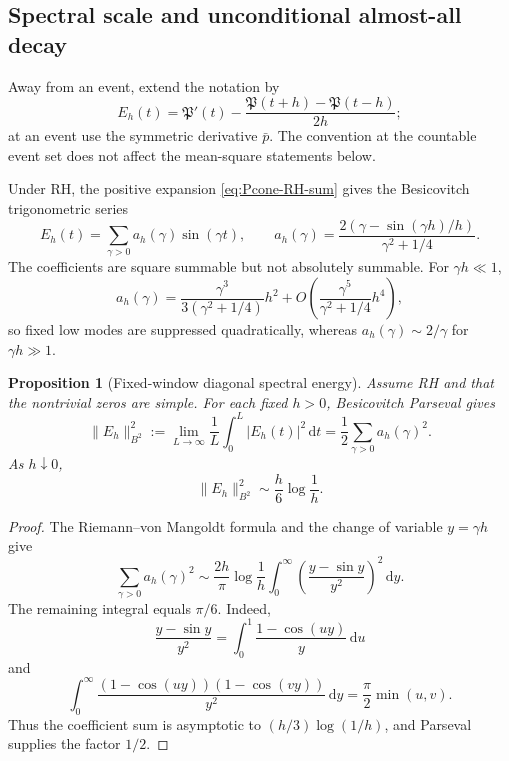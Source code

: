 \documentclass[11pt,a4paper]{article}
\numberwithin{equation}{section}
\newtheorem{proposition}[theorem]{Proposition}
\theoremstyle{definition}
\newcommand{\dd}{\,\mathrm{d}}
\begin{document}
\subsection{Spectral scale and unconditional almost-all decay}

Away from an event, extend the notation by
\[
 E_h(t)=\mathfrak P'(t)
 -\frac{\mathfrak P(t+h)-\mathfrak P(t-h)}{2h};
\]
at an event use the symmetric derivative \(\bar p\).  The convention at the
countable event set does not affect the mean-square statements below.

Under RH, the positive expansion \eqref{eq:Pcone-RH-sum} gives the
Besicovitch trigonometric series
\begin{equation}\label{eq:Eh-spectral-filter}
 E_h(t)=\sum_{\gamma>0}a_h(\gamma)\sin(\gamma t),
 \qquad
 a_h(\gamma)=
 \frac{2\left(\gamma-\sin(\gamma h)/h\right)}{\gamma^2+1/4}.
\end{equation}
The coefficients are square summable but not absolutely summable.  For
\(\gamma h\ll1\),
\[
 a_h(\gamma)
 =\frac{\gamma^3}{3(\gamma^2+1/4)}h^2
 +O\!\left(\frac{\gamma^5}{\gamma^2+1/4}h^4\right),
\]
so fixed low modes are suppressed quadratically, whereas
\(a_h(\gamma)\sim2/\gamma\) for \(\gamma h\gg1\).

\begin{proposition}[Fixed-window diagonal spectral energy]
\label{prop:Eh-spectral-energy}
Assume RH and that the nontrivial zeros are simple.  For each fixed \(h>0\),
Besicovitch Parseval gives
\[
 \|E_h\|_{B^2}^2
 :=\lim_{L\to\infty}\frac1L\int_0^L|E_h(t)|^2\dd t
 =\frac12\sum_{\gamma>0}a_h(\gamma)^2.
\]
As \(h\downarrow0\),
\begin{equation}\label{eq:Eh-spectral-energy-asymptotic}
 \boxed{
 \|E_h\|_{B^2}^2\sim\frac h6\log\frac1h.
 }
\end{equation}
\end{proposition}

\begin{proof}
The Riemann--von Mangoldt formula and the change of variable \(y=\gamma h\)
give
\[
 \sum_{\gamma>0}a_h(\gamma)^2
 \sim\frac{2h}{\pi}\log\frac1h
 \int_0^\infty\left(\frac{y-\sin y}{y^2}\right)^2\dd y.
\]
The remaining integral equals \(\pi/6\).  Indeed,
\[
 \frac{y-\sin y}{y^2}
 =\int_0^1\frac{1-\cos(uy)}y\dd u
\]
and
\[
 \int_0^\infty
 \frac{(1-\cos(uy))(1-\cos(vy))}{y^2}\dd y
 =\frac\pi2\min(u,v).
\]
Thus the coefficient sum is asymptotic to
\((h/3)\log(1/h)\), and Parseval supplies the factor \(1/2\).
\end{proof}
\end{document}
